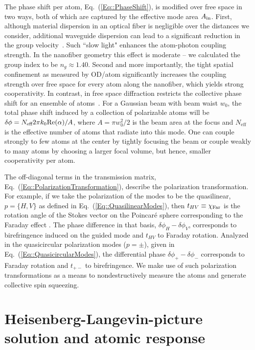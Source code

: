 \documentclass[preprint, aps,pra,onecolumn]{revtex4-1} %
\newcommand{\erf}[1]{Eq.~(\ref{#1})}
\newcommand{\eff}{\text{eff}}
\begin{document}
The phase shift per atom, \erf{Eq::PhaseShift}, is modified over free space in two ways, both of which are captured by the effective mode area $A_{\rm in}$. First, although material dispersion in an optical fiber is negligible over the distances we consider, additional waveguide dispersion can lead to a significant reduction in the group velocity~\cite{hung_trapped_2013,goban_atomlight_2014}.  Such ``slow light" enhances the atom-photon coupling strength. 
In the nanofiber geometry this effect is moderate -- we calculated the group index to be $n_g \approx 1.40$. 
Second and more importantly, the tight spatial confinement as measured by OD/atom significantly increases the coupling strength over free space for every atom along the nanofiber, which yields strong cooperativity.
In contrast, in free space diffraction restricts the collective phase shift for an ensemble of atoms~\cite{tanji-suzuki_chapter_2011, baragiola_three-dimensional_2014}.  
For a Gaussian beam with beam waist $w_0$, the total phase shift induced by a collection of polarizable atoms will be $\delta \phi = N_{\eff} 2 \pi k_0 {\rm Re}({\alpha})/A$, where $A = \pi w^2_0/2$ is the beam area at the focus and $N_{\eff}$ is the effective number of atoms that radiate into this mode.  
One can couple strongly to few atoms at the center by tightly focusing the beam or couple weakly to many atoms by choosing a larger focal volume, but hence, smaller cooperativity per atom.  

The off-diagonal terms in the transmission matrix, \erf{Eq::PolarizationTransformation}, describe the polarization transformation. For example, if we take the polarization of the modes to be the quasilinear, $p = \{H,V\}$ as defined in \erf{Eq::QuasilinearModes}, then $t_{HV} \equiv \chi_{\rm Far}$ is the rotation angle of the Stokes vector on the Poincar\'{e} sphere corresponding to the Faraday effect \cite{hammerer_quantum_2010, deutsch_quantum_2010}.  
The phase difference in that basis, $\delta  \phi_H - \delta \phi_V$, corresponds to birefringence induced on the guided mode and $t_{HV}$ to Faraday rotation.  
Analyzed in the quasicircular polarization modes ($p=\pm$), given in \erf{Eq::QuasicircularModes}, the differential phase $\delta \phi_+ -\delta  \phi_-$ corresponds to Faraday rotation and $t_{+-}$ to birefringence.  
We make use of such polarization transformations as a means to nondestructively measure the atoms and generate collective spin squeezing.

	
\section{Heisenberg-Langevin-picture solution and atomic response} \label{Sec::HeisenbergLangevin}
	
\end{document}
